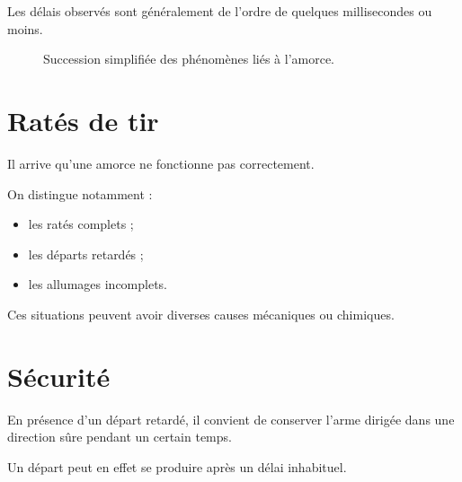 Les délais observés sont généralement de l'ordre de quelques millisecondes ou
moins.

\begin{figure}[htbp]
\centering


\caption{Succession simplifiée des phénomènes liés à l'amorce.}
\label{fig:chronologie_amorcage}

\end{figure}

\section{Ratés de tir}

Il arrive qu'une amorce ne fonctionne pas correctement.

On distingue notamment :

\begin{itemize}
    \item les ratés complets ;
    \item les départs retardés ;
    \item les allumages incomplets.
\end{itemize}

Ces situations peuvent avoir diverses causes mécaniques ou chimiques.

\section{Sécurité}

En présence d'un départ retardé, il convient de conserver l'arme dirigée dans
une direction sûre pendant un certain temps.

Un départ peut en effet se produire après un délai inhabituel.

